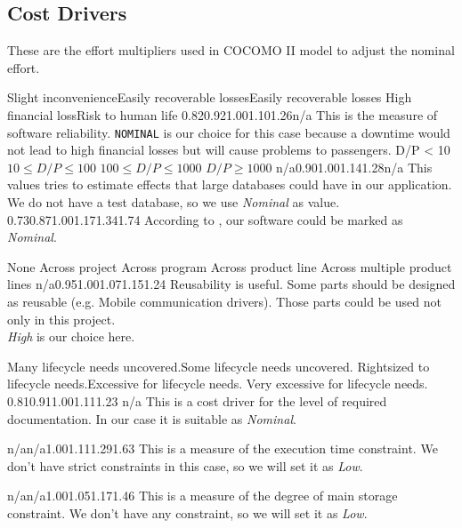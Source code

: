 \pagebreak
\subsection{Cost Drivers} %
These are the effort multipliers used in COCOMO II model to adjust the
nominal effort. 
\label{sub:cost_drivers}

{Slight inconvenience}{Easily recoverable losses}{Easily recoverable losses}
{High financial loss}{Risk to human life}{}
{0.82}{0.92}{1.00}{1.10}{1.26}{n/a} {
    This is the measure of software reliability. \texttt{NOMINAL} is our choice
    for this case because a downtime would not lead to high financial losses
    but will cause problems to passengers.
}
{ }{D/P < 10}{$ 10 \leq D/P \le 100 $}{ $ 100 \leq D/P \le 1000 $} { $ D/P \ge 1000 $ } { }
{n/a}{0.90}{1.00}{1.14}{1.28}{n/a}
{This values tries to estimate effects that large databases could have in our application.
    We do not have a test database, so we use \emph{Nominal} as value.
}
{ 0.73}{0.87}{1.00}{1.17}{1.34}{1.74} { 
    According to \cite[Table~20]{bib:cocomo2}, our software could be marked as \emph{Nominal}.
}

{ } { None } { Across project } { Across program } { Across product line} 
{Across multiple product lines} { n/a}{0.95}{1.00}{1.07}{1.15}{1.24} {
    Reusability is useful. Some parts should be designed as reusable (e.g.
    Mobile communication drivers). Those parts could be used not only in this project. \\
    \emph{High} is our choice here.
}

{Many life\-cycle needs uncovered.}{Some life\-cycle needs uncovered.}
{Right\-sized to life\-cycle needs.}{Excessive for life\-cycle needs.}
{Very excessive for life\-cycle needs.}{ } 
{0.81}{0.91}{1.00}{1.11}{1.23}{ n/a } { 
    This is a cost driver for the level of required documentation. 
    In our case it is suitable as \emph{Nominal}.
}

\pagebreak

{n/a}{n/a}{1.00}{1.11}{1.29}{1.63} {
    This is a measure of the execution time constraint. We don't have strict constraints in this case, so we will set it as \emph{Low}.
}

{n/a}{n/a}{1.00}{1.05}{1.17}{1.46} {
    This is a measure of the degree of main storage constraint. 
    We don't have any constraint, so we will set it as \emph{Low}.
}

